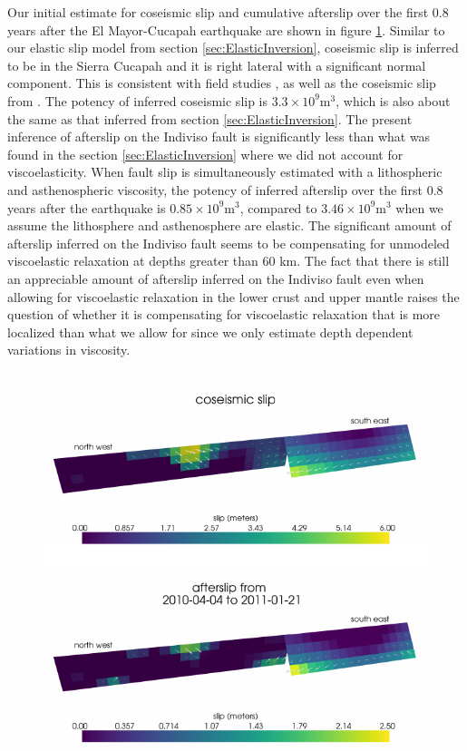 \documentclass[1p]{elsarticle}
\begin{document}
Our initial estimate for coseismic slip and cumulative afterslip over the first 0.8 years after the El Mayor-Cucapah earthquake are shown in figure \ref{fig:InitialSlip}.  Similar to our elastic slip model from section \ref{sec:ElasticInversion}, coseismic slip is inferred to be in the Sierra Cucapah and it is right lateral with a significant normal component.  This is consistent with field studies \cite{Fletcher2014}, as well as the coseismic slip from \cite{Wei2011}. The potency of inferred coseismic slip is $3.3\times 10^{9} \mathrm{m}^3$, which is also about the same as that inferred from section \ref{sec:ElasticInversion}. The present inference of afterslip on the Indiviso fault is significantly less than what was found in the section \ref{sec:ElasticInversion} where we did not account for viscoelasticity. When fault slip is simultaneously estimated with a lithospheric and asthenospheric viscosity, the potency of inferred afterslip over the first 0.8 years after the earthquake is $0.85\times 10^9 \mathrm{m}^3$, compared to $3.46\times10^{9} \mathrm{m}^3$ when we assume the lithosphere and asthenosphere are elastic.  The significant amount of afterslip inferred on the Indiviso fault seems to be compensating for unmodeled viscoelastic relaxation at depths greater than $60$ km.  The fact that there is still an appreciable amount of afterslip inferred on the Indiviso fault even when allowing for viscoelastic relaxation in the lower crust and upper mantle raises the question of whether it is compensating for viscoelastic relaxation that is more localized than what we allow for since we only estimate depth dependent variations in viscosity.  

\begin{figure}
\includegraphics[scale=0.7]{Figures/InitialSlip}
\caption{}
\label{fig:InitialSlip}
\end{figure} 
\end{document}
